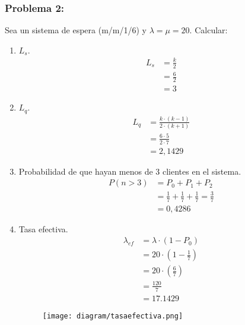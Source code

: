 \documentclass{templateNote}
\begin{document}
\subsubsection{Problema 2:}
Sea un sistema de espera (m/m/1/6) y $\lambda = \mu = 20$.
Calcular:
\begin{enumerate}
    \item $L_s$.
    \begin{align*}
        L_s &= \frac{k}{2} \\
        &= \frac{6}{2} \\
        &= 3
    \end{align*}

    \item $L_q$.
    \begin{align*}
        L_q &= \frac{k \cdot (k - 1)}{2 \cdot (k + 1)} \\
        &= \frac{6 \cdot 5}{2 \cdot 7} \\
        &= 2,1429
    \end{align*}

    \item Probabilidad de que hayan menos de 3 clientes en el sistema.
    \begin{align*}
        P(n > 3) &= P_0 + P_1 + P_2 \\
        &= \frac{1}{7} + \frac{1}{7} + \frac{1}{7} = \frac{3}{7} \\
        &= 0,4286
    \end{align*}

    \item Tasa efectiva.
    \begin{align*}
        \lambda_{ef} &= \lambda \cdot (1 - P_0) \\
        &= 20 \cdot (1 - \frac{1}{7}) \\
        &= 20 \cdot (\frac{6}{7}) \\
        &= \frac{120}{7} \\
        &= 17.1429
    \end{align*}

    \begin{figure}[H]
        \centering
        \texttt{[image: diagram/tasaefectiva.png]}
    \end{figure}
\end{enumerate}
\newpage
\end{document}
